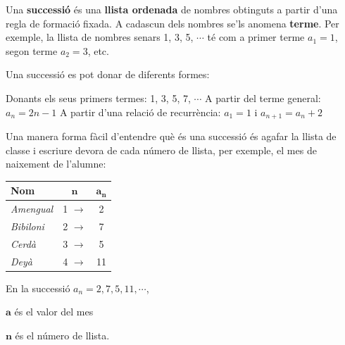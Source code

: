 \begin{theorybox}
 Una \textbf{successió} és una \textbf{llista ordenada} de nombres obtinguts a partir d'una regla de formació fixada. A cadascun dels nombres se'ls anomena \textbf{terme}. Per exemple, la llista de nombres senars 1, 3, 5, $\cdots$ té com a primer terme $a_1 = 1$, segon terme $a_2=3$, etc.
 
 Una successió es pot donar de diferents formes:
 \begin{itemize}
 	\exer Donants els seus primers termes: 1, 3, 5, 7, $\cdots$
 	\exer A partir del terme general:  $a_n = 2n-1$
 	\exer A partir d'una relació de recurrència:  $a_1 = 1$ i $a_{n+1} = a_n + 2$
 \end{itemize}
\end{theorybox}
\vspace{-0.5cm}
\begin{blueshaded}
	Una manera forma fàcil d'entendre què és una successió és agafar la llista de classe i escriure devora de cada número de llista, per exemple, el mes de naixement de l'alumne:
	
	\begin{minipage}{0.5\textwidth}
	 	\begin{tabular}{lcc}
	 	\textbf{Nom} & $\mathbf{n}$ & $\mathbf{a_n}$ \\ \hline	
	 	\emph{Amengual} & 1 $\rightarrow$ & 2 \\
	 	\emph{Bibiloni} & 2 $\rightarrow$ & 7 \\
	 	\emph{Cerdà}    & 3 $\rightarrow$ & 5 \\
	 	\emph{Deyà}    & 4 $\rightarrow$ & 11
	 \end{tabular}
	\end{minipage}
	\begin{minipage}{0.5\textwidth}	
		En la successió $a_n= 2, 7, 5, 11, \cdots$,
		
		\qquad $\mathbf{a}$ és el valor del mes 
		 
		 \qquad $\mathbf{n}$ és el número de llista.
	\end{minipage}
\end{blueshaded}


